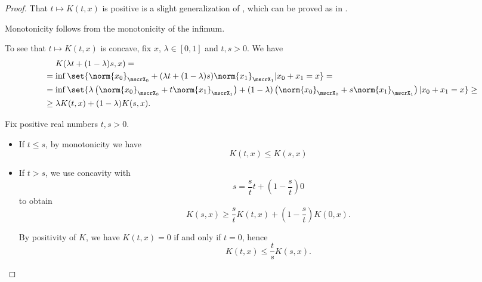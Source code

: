 \begin{proof}
   That \( t \mapsto K(t, x) \) is positive is a slight generalization of , which can be proved as in .

  Monotonicity follows from the monotonicity of the infimum.

  To see that \( t \mapsto K(t, x) \) is concave, fix \( x \), \( \lambda \in [0, 1] \) and \( t, s > 0 \). We have
  \begin{align*}
    &\phantom{{}={}}
    K(\lambda t + (1 - \lambda) s, x)
    = \\ &=
    \inf \set{ \norm{x_0}_{\mscrX_0} + (\lambda t + (1 - \lambda) s)\norm{x_1}_{\mscrX_1} | x_0 + x_1 = x }
    = \\ &=
    \inf \set{ \lambda \left(\norm{x_0}_{\mscrX_0} + t \norm{x_1}_{\mscrX_1} \right) + (1 - \lambda) \left(\norm{x_0}_{\mscrX_0} + s \norm{x_1}_{\mscrX_1} \right) | x_0 + x_1 = x }
    \geq \\ &\geq
    \lambda K(t, x) + (1 - \lambda) K(s, x).
  \end{align*}

   Fix positive real numbers \( t, s > 0 \).
  \begin{itemize}
    \item If \( t \leq s \), by monotonicity we have
    \begin{equation}\label{eq:def:k_functional_properties/inequality/monotonicity}
      K(t, x) \leq K(s, x)
    \end{equation}

    \item If \( t > s \), we use concavity with
    \begin{equation*}
      s = \frac s t t + \left(1 - \frac s t \right) 0
    \end{equation*}
    to obtain
    \begin{equation*}
      K(s, x) \geq \frac s t K(t, x) + \left(1 - \frac s t \right) K(0, x).
    \end{equation*}

    By positivity of \( K \), we have \( K(t, x) = 0 \) if and only if \( t = 0 \), hence
    \begin{equation}\label{eq:def:k_functional_properties/inequality/concavity}
      K(t, x) \leq \frac t s K(s, x).
    \end{equation}
  \end{itemize}


\end{proof}
